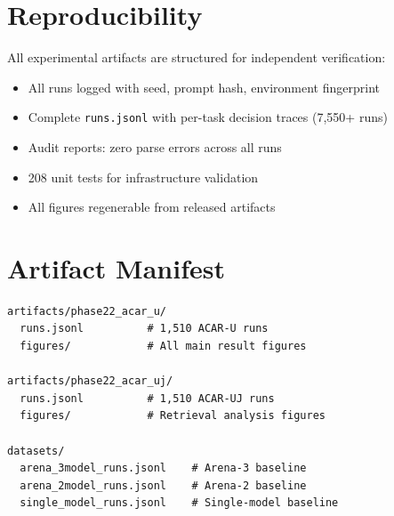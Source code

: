\documentclass{article}
\begin{document}
\section{Reproducibility}

All experimental artifacts are structured for independent verification:

\begin{itemize}[leftmargin=*]
    \item All runs logged with seed, prompt hash, environment fingerprint
    \item Complete \texttt{runs.jsonl} with per-task decision traces (7,550+ runs)
    \item Audit reports: zero parse errors across all runs
    \item 208 unit tests for infrastructure validation
    \item All figures regenerable from released artifacts
\end{itemize}

\section{Artifact Manifest}

\begin{verbatim}
artifacts/phase22_acar_u/
  runs.jsonl          # 1,510 ACAR-U runs
  figures/            # All main result figures

artifacts/phase22_acar_uj/
  runs.jsonl          # 1,510 ACAR-UJ runs
  figures/            # Retrieval analysis figures

datasets/
  arena_3model_runs.jsonl    # Arena-3 baseline
  arena_2model_runs.jsonl    # Arena-2 baseline
  single_model_runs.jsonl    # Single-model baseline
\end{verbatim}
\end{document}
